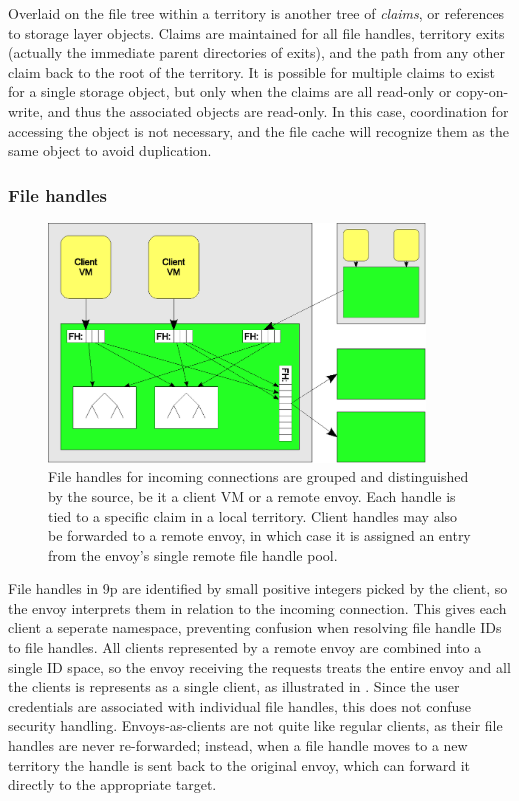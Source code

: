 Overlaid on the file tree within a territory is another tree of \emph{claims}, or references to storage layer objects. Claims are maintained for all file handles, territory exits (actually the immediate parent directories of exits), and the path from any other claim back to the root of the territory. It is possible for multiple claims to exist for a single storage object, but only when the claims are all read-only or copy-on-write, and thus the associated objects are read-only. In this case, coordination for accessing the object is not necessary, and the file cache will recognize them as the same object to avoid duplication.

\subsubsection{File handles}

\begin{figure}[tp]
\centering
\includegraphics[width=100mm]{figures/file-handles}
\caption[Managing file handles in local and remote envoys]{File handles for incoming connections are grouped and distinguished by the source, be it a client VM or a remote envoy. Each handle is tied to a specific claim in a local territory. Client handles may also be forwarded to a remote envoy, in which case it is assigned an entry from the envoy's single remote file handle pool.}
\label{fig:file-handles}
\end{figure}

File handles in 9p are identified by small positive integers picked by the client, so the envoy interprets them in relation to the incoming connection. This gives each client a seperate namespace, preventing confusion when resolving file handle IDs to file handles. All clients represented by a remote envoy are combined into a single ID space, so the envoy receiving the requests treats the entire envoy and all the clients is represents as a single client, as illustrated in . Since the user credentials are associated with individual file handles, this does not confuse security handling. Envoys-as-clients are not quite like regular clients, as their file handles are never re-forwarded; instead, when a file handle moves to a new territory the handle is sent back to the original envoy, which can forward it directly to the appropriate target.

